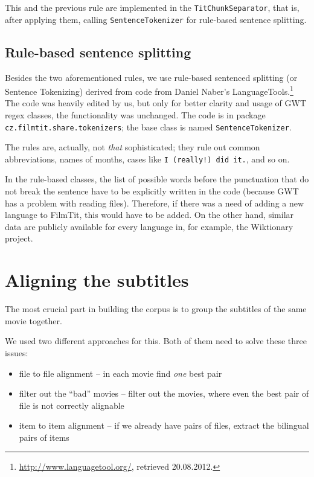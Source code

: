 This and the previous rule are implemented in the \texttt{TitChunkSeparator}, that is, after applying them, calling \texttt{SentenceTokenizer} for rule-based sentence splitting.

\subsection*{Rule-based sentence splitting}
Besides the two aforementioned rules, we use rule-based sentenced splitting (or Sentence Tokenizing) derived from code from Daniel Naber's LanguageTools.\footnote{\url{http://www.languagetool.org/}, retrieved 20.08.2012.} The code was heavily edited by us, but only for better clarity and usage of GWT regex classes, the functionality was unchanged. The code is in package \texttt{cz.filmtit.share.tokenizers}; the base class is named \texttt{SentenceTokenizer}.

The rules are, actually, not \emph{that} sophisticated; they rule out common abbreviations, names of months, cases like \texttt{I (really!) did it.}, and so on.

In the rule-based classes, the list of possible words before the punctuation that do not break the sentence have to be explicitly written in the code (because GWT has a problem with reading files). Therefore, if there was a need of adding a new language to FilmTit, this would have to be added. On the other hand, similar data are publicly available for every language in, for example, the Wiktionary project.

\section{Aligning the subtitles}
\label{sec:aligning_subtitles}
The most crucial part in building the corpus is to group the subtitles of the same movie together.

We used two different approaches for this. Both of them need to solve these three issues:
\begin{itemize}
    \item file to file alignment -- in each movie find \emph{one} best pair
    \item filter out the ``bad'' movies -- filter out the movies, where even the best pair of file is not correctly alignable
    \item item to item alignment -- if we already have pairs of files, extract the bilingual pairs of items 
\end{itemize}

